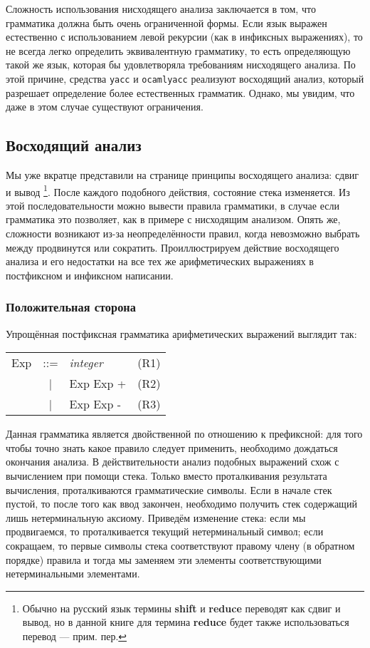 Сложность использования нисходящего анализа заключается в том, что грамматика
должна быть очень ограниченной формы. Если язык выражен естественно с
использованием левой рекурсии (как в инфиксных выражениях), то не всегда легко
определить эквивалентную грамматику, то есть определяющую такой же язык, которая
бы удовлетворяла требованиям нисходящего анализа. По этой причине, средства
\texttt{yacc} и \texttt{ocamlyacc} реализуют восходящий анализ, который
разрешает определение более естественных грамматик. Однако, мы увидим, что даже
в этом случае существуют ограничения.

\subsection{Восходящий анализ}

Мы уже вкратце представили на странице \pageref{??} принципы восходящего
анализа: сдвиг и вывод \footnote{Обычно на русский язык термины {\bf shift} и
{\bf reduce} переводят как сдвиг и вывод, но в данной книге для термина {\bf
reduce} будет также использоваться перевод  --- прим. пер. }.
После каждого подобного действия, состояние стека изменяется. Из этой
последовательности можно вывести правила грамматики, в случае если грамматика
это позволяет, как в примере с нисходящим анализом. Опять же, сложности
возникают из-за неопределённости правил, когда невозможно выбрать между
продвинутся или сократить. Проиллюстрируем действие восходящего анализа и его
недостатки на все тех же арифметических выражениях в постфиксном и инфиксном
написании.

\subsubsection{Положительная сторона}

Упрощённая постфиксная грамматика арифметических выражений выглядит так:

\begin{center}
	\begin{tabular}{rclc}
		Exp & ::= & {\it integer} & (R1) \\
		 & | & Exp Exp + & (R2) \\
		 & | & Exp Exp - & (R3) \\
	\end{tabular}
\end{center}

Данная грамматика является двойственной по отношению к префиксной: для того
чтобы точно знать какое правило следует применить, необходимо дождаться
окончания анализа. В действительности анализ подобных выражений схож с
вычислением при помощи стека. Только вместо проталкивания результата вычисления,
проталкиваются грамматические символы. Если в начале стек пустой, то после того
как ввод закончен, необходимо получить стек содержащий лишь нетерминальную
аксиому. Приведём изменение стека: если мы продвигаемся, то проталкивается
текущий нетерминальный символ; если сокращаем, то первые символы стека
соответствуют правому члену (в обратном порядке) правила и тогда мы заменяем эти
элементы соответствующими нетерминальными элементами.

